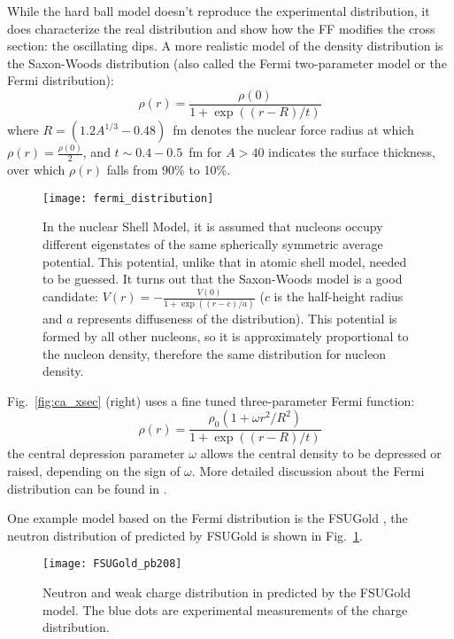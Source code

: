 While the hard ball model doesn't reproduce the experimental distribution, it does
characterize the real distribution and show how the FF modifies the cross section:
the oscillating dips. A more realistic model of the density distribution is the
Saxon-Woods distribution (also called the Fermi two-parameter model or the Fermi
distribution):
\begin{equation}
    \rho(r) = \frac{\rho(0)}{1 + \exp((r-R)/t)}
\end{equation}
where $R = (1.2A^{1/3} - 0.48)$~fm denotes the nuclear force radius at which 
$\rho(r) = \frac{\rho(0)}{2}$,
and $t \sim 0.4-0.5$~fm for  $A > 40$ indicates the surface thickness, 
over which $\rho(r)$ falls from 90\% to 10\%.
\begin{figure}[!h]
    \centering
    \texttt{[image: fermi\_distribution]}
    \caption[fermi distribution]
    {In the nuclear Shell Model, it is assumed that nucleons occupy 
    different eigenstates of the same spherically symmetric average potential.
    This potential, unlike that in atomic shell model, needed to be guessed. 
    It turns out that the Saxon-Woods model is a good candidate: 
    $V(r) = -\frac{V(0)}{1+\exp((r-c)/a)}$ ($c$ is the half-height radius and $a$ represents
    diffuseness of the distribution). This potential is formed
    by all other nucleons, so it is approximately proportional to the nucleon density, 
    therefore the same distribution for nucleon density.} 
\end{figure}

Fig.~\ref{fig:ca_xsec} (right) uses a fine tuned three-parameter Fermi function:
\begin{equation}
    \rho(r) = \frac{\rho_0(1 + \omega r^2/R^2)}{1 + \exp((r-R)/t)}
    \label{eq:3-para_Fermi}
\end{equation}
the central depression parameter $\omega$ allows the central density to be depressed
or raised, depending on the sign of $\omega$. More detailed discussion about the Fermi 
distribution can be found in \cite{Maximon:1966sqn}.

One example model based on the Fermi distribution is the FSUGold \cite{PhysRevLett.95.122501},
the neutron distribution of \Pb predicted by FSUGold is shown in Fig.~\ref{fig:FSUGold_pb208}.
\begin{figure}[!h]
    \centering
    \texttt{[image: FSUGold\_pb208]}
    \caption[Neutron distribution from FSUGold]
    {Neutron and weak charge distribution in \Pb predicted by the FSUGold model.
    The blue dots are experimental measurements of the charge distribution.}
    \label{fig:FSUGold_pb208}
\end{figure}

